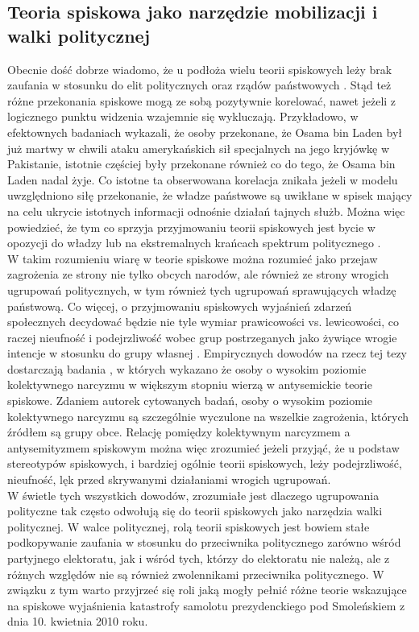 \documentclass[man]{apa6}
\begin{document}
	\subsection{Teoria spiskowa jako narzędzie mobilizacji i walki politycznej}
	
	Obecnie dość dobrze wiadomo, że u podłoża wielu teorii spiskowych leży brak zaufania w stosunku do elit politycznych oraz rządów państwowych \parencite[zob. przegląd w,][]{van2014power}. Stąd też różne przekonania spiskowe mogą ze sobą pozytywnie korelować, nawet jeżeli z logicznego punktu widzenia wzajemnie się wykluczają. Przykładowo, \textcite{wood2012dead} w efektownych badaniach wykazali, że osoby przekonane, że Osama bin Laden był już martwy w chwili ataku amerykańskich sił specjalnych na jego kryjówkę w Pakistanie, istotnie częściej były przekonane również co do tego, że Osama bin Laden nadal żyje. Co istotne ta obserwowana korelacja znikała jeżeli w modelu uwzględniono siłę przekonanie, że władze państwowe są uwikłane w spisek mający na celu ukrycie istotnych informacji odnośnie działań tajnych służb. Można więc powiedzieć, że tym co sprzyja przyjmowaniu teorii spiskowych jest bycie w opozycji do władzy lub na ekstremalnych krańcach spektrum politycznego \parencite[patrz, np.,][]{inglehart1987extremist}.\\
	W takim rozumieniu wiarę w teorie spiskowe można rozumieć jako przejaw zagrożenia ze strony nie tylko obcych narodów, ale również ze strony wrogich ugrupowań politycznych, w tym również tych ugrupowań sprawujących władzę państwową. Co więcej, o przyjmowaniu spiskowych wyjaśnień zdarzeń społecznych decydować będzie nie tyle wymiar prawicowości vs. lewicowości, co raczej nieufność i podejrzliwość wobec grup postrzeganych jako żywiące wrogie intencje w stosunku do grupy własnej \parencite{prooijen2015mutual}. Empirycznych dowodów na rzecz tej tezy dostarczają badania \textcite{golec2012collective}, w których wykazano że osoby o wysokim poziomie kolektywnego narcyzmu w większym stopniu wierzą w antysemickie teorie spiskowe. Zdaniem autorek cytowanych badań, osoby o wysokim poziomie kolektywnego narcyzmu są szczególnie wyczulone na wszelkie zagrożenia, których źródłem są grupy obce. Relację pomiędzy kolektywnym narcyzmem a antysemityzmem spiskowym można więc zrozumieć jeżeli przyjąć, że u podstaw stereotypów spiskowych, i bardziej ogólnie teorii spiskowych, leży podejrzliwość, nieufność, lęk przed skrywanymi działaniami wrogich ugrupowań.\\
	W świetle tych wszystkich dowodów, zrozumiałe jest dlaczego ugrupowania polityczne tak często odwołują się do teorii spiskowych jako narzędzia walki politycznej. W walce politycznej, rolą teorii spiskowych jest bowiem stałe podkopywanie zaufania w stosunku do przeciwnika politycznego zarówno wśród partyjnego elektoratu, jak i wśród tych, którzy do elektoratu nie należą, ale z różnych względów nie są również zwolennikami przeciwnika politycznego. W związku z tym warto przyjrzeć się roli jaką mogły pełnić różne teorie wskazujące na spiskowe wyjaśnienia katastrofy samolotu prezydenckiego pod Smoleńskiem z dnia 10. kwietnia 2010 roku.\\
\end{document}
